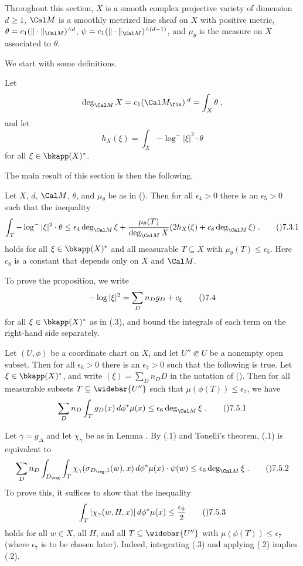  Throughout this section, $X$ is a smooth complex projective
variety of dimension $d\ge1$, $\Cal M$ is a smoothly metrized line sheaf on $X$
with positive metric, $\theta=c_1(\|\cdot\|_{\Cal M})^{\wedge d}$,
$\psi=c_1(\|\cdot\|_{\Cal M})^{\wedge(d-1)}$, and $\mu_\theta$ is
the measure on $X$ associated to $\theta$.
\endit

We start with some definitions.

  Let
$$\deg_{\Cal M} X = c_1(\Cal M_\fin)^{\cdot d} = \int_X \theta\;,$$
and let
$$h_X(\xi) = \int_X {-\log^{-}|\xi|^2}\cdot\theta$$
for all $\xi\in\bkapp(X)^{*}$.
\endit

The main result of this section is then the following.

  Let $X$, $d$, $\Cal M$, $\theta$, and $\mu_\theta$ be
as in ().
Then for all $\epsilon_4>0$ there is an $\epsilon_5>0$ such that the inequality
$$\int_T {-\log^{-}|\xi|^2} \cdot\theta
  \le \epsilon_4\deg_{\Cal M}\xi
    + \frac{\mu_\theta(T)}{\deg_{\Cal M} X} (2h_X(\xi) + c_8\deg_{\Cal M} \xi)
  \;.\tag\07.3.1$$
holds for all $\xi\in\bkapp(X)^{*}$ and all measurable $T\subseteq X$
with $\mu_\theta(T)\le\epsilon_5$.  Here $c_8$ is a constant that depends
only on $X$ and $\Cal M$.
\endit

To prove the proposition, we write
$$-\log|\xi|^2 = \sum_D n_D g_D + c_\xi\tag\07.4$$
for all $\xi\in\bkapp(X)^{*}$ as in (.3), and bound the integrals of each
term on the right-hand side separately.

  Let $(U,\phi)$ be a coordinate chart on $X$, and
let $U''\Subset U$ be a nonempty open subset.
Then for all $\epsilon_6>0$ there is an $\epsilon_7>0$ such that the following
is true.  Let $\xi\in\bkapp(X)^{*}$, and write $(\xi)=\sum_D n_D D$
in the notation of ().  Then for all measurable subsets
$T\subseteq\widebar{U''}$ such that $\mu(\phi(T))\le\epsilon_7$, we have
$$\sum_D n_D \int_T g_D(x)\,d\phi^{*}\mu(x) \le \epsilon_6\deg_{\Cal M} \xi\;.
  \tag\07.5.1$$
\endit

  Let $\gamma=g_\Delta$ and let $\chi_\gamma$ be as in Lemma .
By (.1) and Tonelli's theorem, (.1) is equivalent to
$$\sum_D n_D \int_{D_\reg} \int_T \chi_\gamma(\sigma_{D_\reg,1}(w),x)
    \,d\phi^{*}\mu(x)\cdot\psi(w)
  \le \epsilon_6\deg_{\Cal M} \xi\;.
  \tag\07.5.2$$
To prove this, it suffices to show that the inequality
$$\int_T |\chi_\gamma(w,H,x)|\,d\phi^{*}\mu(x)
  \le \frac{\epsilon_6}{2}\tag\07.5.3$$
holds for all $w\in X$, all $H$, and all $T\subseteq\widebar{U''}$
with $\mu(\phi(T))\le\epsilon_7$ (where $\epsilon_7$ is to be chosen later).
Indeed, integrating (.3) and applying (.2) implies (.2).

